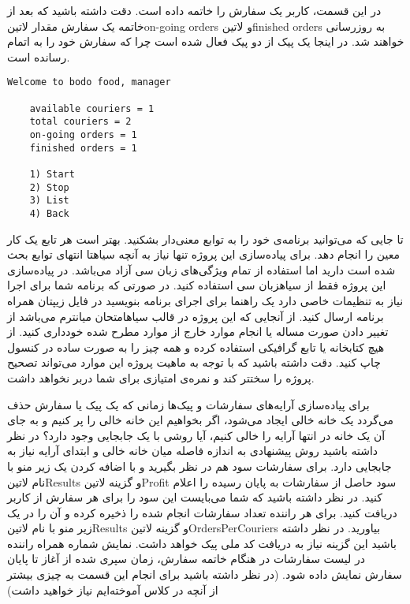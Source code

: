 \documentclass[../main.tex]{subfiles}
\begin{document}
در این قسمت، کاربر یک سفارش را خاتمه داده است. دقت داشته باشید که بعد از خاتمه یک سفارش مقدار ‌لاتین{on-going orders} و ‌لاتین{finished orders} به روزرسانی خواهند شد. در اینجا یک پیک از دو پیک فعال شده است چرا که سفارش خود را به اتمام رسانده است.

\begin{latin}
\begin{lstlisting}[]
    Welcome to bodo food, manager

    available couriers = 1
    total couriers = 2
    on-going orders = 1
    finished orders = 1

    1) Start
    2) Stop
    3) List
    4) Back
\end{lstlisting}
\end{latin}


     تا جایی که می‌توانید برنامه‌ی خود را به توابع معنی‌دار بشکنید. بهتر است هر تابع یک کار معین را انجام دهد.
     برای پیاده‌سازی این پروژه تنها نیاز به آنچه ‌سیاه{تا انتهای توابع} بحث شده است دارید اما استفاده از تمام ویژگی‌های زبان سی آزاد می‌باشد.
     در پیاده‌سازی این پروژه فقط از ‌سیاه{زبان سی} استفاده کنید. در صورتی که برنامه شما برای اجرا نیاز به تنظیمات خاصی دارد یک راهنما برای اجرای برنامه بنویسید در فایل زیپتان همراه برنامه ارسال کنید.
     از آنجایی که این پروژه در قالب ‌سیاه{امتحان میانترم} می‌باشد از تغییر دادن صورت مساله یا انجام موارد خارج از موارد مطرح شده خودداری کنید.
     از هیچ کتابخانه یا تابع گرافیکی استفاده کرده و همه چیز را به صورت ساده در کنسول چاپ کنید. دقت داشته باشید که با توجه به ماهیت پروژه این موارد می‌تواند تصحیح پروژه را سختتر کند و نمره‌ی امتیازی برای شما دربر نخواهد داشت.


     برای پیاده‌سازی آرایه‌های سفارشات و پیک‌ها زمانی که یک پیک یا سفارش حذف می‌گردد یک خانه خالی ایجاد می‌شود، اگر بخواهیم این خانه خالی را پر کنیم و به جای آن یک خانه در انتها آرایه را خالی کنیم، آیا روشی با یک جابجایی وجود دارد؟ در نظر داشته باشید روش پیشنهادی به اندازه فاصله میان خانه خالی و ابتدای آرایه نیاز به جابجایی دارد.
     برای سفارشات سود هم در نظر بگیرید و با اضافه کردن یک زیر منو با نام ‌لاتین{Results} و گزینه ‌لاتین{Profit} سود حاصل از سفارشات به پایان رسیده را اعلام کنید. در نظر داشته باشید که شما می‌بایست این سود را برای هر سفارش از کاربر دریافت کنید.
     برای هر راننده تعداد سفارشات انجام شده را ذخیره کرده و آن را در یک زیر منو با نام ‌لاتین{Results} و گزینه ‌لاتین{OrdersPerCouriers} بیاورید. در نظر داشته باشید این گزینه نیاز به دریافت کد ملی پیک خواهد داشت.
     نمایش شماره همراه راننده در لیست سفارشات
     در هنگام خاتمه سفارش، زمان سپری شده از آغاز تا پایان سفارش نمایش داده شود. (در نظر داشته باشید برای انجام این قسمت به چیزی بیشتر از آنچه در کلاس آموخته‌ایم نیاز خواهید داشت)
\end{document}
